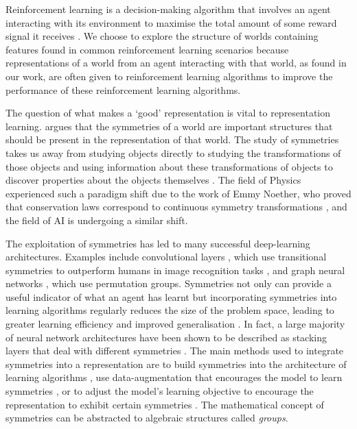 Reinforcement learning is a decision-making algorithm that involves an agent interacting with its environment to maximise the total amount of some reward signal it receives \autocite{sutton2018reinforcement,li2017deep,arulkumaran2017deep,nian2020review}.
We choose to explore the structure of worlds containing features found in common reinforcement learning scenarios because representations of a world from an agent interacting with that world, as found in our work, are often given to reinforcement learning algorithms to improve the performance of these reinforcement learning algorithms.

The question of what makes a `good' representation is vital to representation learning.
\autocite{Higgins2018} argues that the symmetries of a world are important structures that should be present in the representation of that world.
The study of symmetries takes us away from studying objects directly to studying the transformations of those objects and using information about these transformations of objects to discover properties about the objects themselves \autocite{Higgins2022}.
The field of Physics experienced such a paradigm shift due to the work of Emmy Noether, who proved that conservation laws correspond to continuous symmetry transformations \autocite{Noether1918}, and the field of AI is undergoing a similar shift.

The exploitation of symmetries has led to many successful deep-learning architectures.
Examples include convolutional layers \autocite{LeCun1995}, which use transitional symmetries to outperform humans in image recognition tasks \autocite{Dai2021}, and graph neural networks \autocite{Battaglia2018}, which use permutation groups.
Symmetries not only can provide a useful indicator of what an agent has learnt but incorporating symmetries into learning algorithms regularly reduces the size of the problem space, leading to greater learning efficiency and improved generalisation \autocite{Higgins2022}.
In fact, a large majority of neural network architectures have been shown to be described as stacking layers that deal with different symmetries \autocite{Bronstein2021}.
The main methods used to integrate symmetries into a representation are to build symmetries into the architecture of learning algorithms \autocite{Baek2021, Batzner2022}, use data-augmentation that encourages the model to learn symmetries \autocite{Chen2020, Kohler2020}, or to adjust the model's learning objective to encourage the representation to exhibit certain symmetries \autocite{burgess2018understanding, Jaderberg2016}.
The mathematical concept of symmetries can be abstracted to algebraic structures called \textit{groups}.

